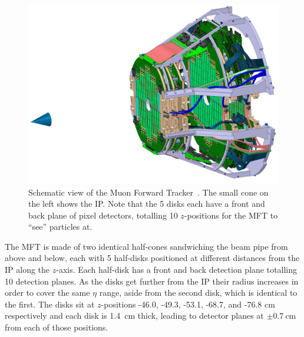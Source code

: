 \begin{figure}[h]
    \begin{center}
        \includegraphics[width=.8\textwidth]{Figs/MFT_schematic.jpg}
        \caption{Schematic view of the Muon Forward Tracker~\cite{MFT_Schematic}. The small cone on the left shows the IP. Note that the 5 disks each have a front and back plane of pixel detectors, totalling 10 $z$-positions for the MFT to ``see'' particles at.}
        \label{fig:MFT Schematic}
    \end{center}
\end{figure}

The MFT is made of two identical half-cones sandwiching the beam pipe from above and below, each with 5 half-disks positioned at different distances from the IP along the $z$-axis. Each half-disk has a front and back detection plane totalling 10 detection planes. As the disks get further from the IP their radius increases in order to cover the same $\eta$ range, aside from the second disk, which is identical to the first. The disks sit at $z$-positions -46.0, -49.3, -53.1, -68.7, and -76.8 \si{\centi\metre} respectively and each disk is \SI{1.4}{\centi\metre} thick, leading to detector planes at $\pm \SI{0.7}{\centi\metre}$ from each of those positions.

